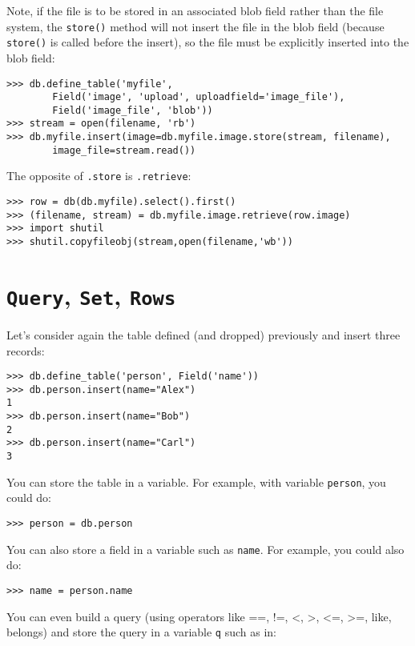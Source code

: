 \documentclass[justified,sixbynine,notoc]{tufte-book}
\def\ft{\small\tt}
\def\inxx#1{\index{#1}}
\begin{document}
\begin{fullwidth}
Note, if the file is to be stored in an associated blob field rather than the file system, the {\ft store()} method will not insert the file in the blob field (because {\ft store()} is called before the insert), so the file must be explicitly inserted into the blob field:
\begin{lstlisting}
>>> db.define_table('myfile',
        Field('image', 'upload', uploadfield='image_file'),
        Field('image_file', 'blob'))
>>> stream = open(filename, 'rb')
>>> db.myfile.insert(image=db.myfile.image.store(stream, filename),
        image_file=stream.read())
\end{lstlisting}

The opposite of {\ft .store} is {\ft .retrieve}:

\begin{lstlisting}
>>> row = db(db.myfile).select().first()
>>> (filename, stream) = db.myfile.image.retrieve(row.image)
>>> import shutil
>>> shutil.copyfileobj(stream,open(filename,'wb'))
\end{lstlisting}

\goodbreak\section{{\ft Query}, {\ft Set}, {\ft Rows}}

Let's consider again the table defined (and dropped) previously and insert three records:
\begin{lstlisting}
>>> db.define_table('person', Field('name'))
>>> db.person.insert(name="Alex")
1
>>> db.person.insert(name="Bob")
2
>>> db.person.insert(name="Carl")
3
\end{lstlisting}

You can store the table in a variable. For example, with variable {\ft person}, you could do:

\inxx{Table}
\begin{lstlisting}
>>> person = db.person
\end{lstlisting}

You can also store a field in a variable such as {\ft name}.  For example, you could also do:

\inxx{Field}
\begin{lstlisting}
>>> name = person.name
\end{lstlisting}

You can even build a query (using operators like ==, !=, <, >, <=, >=, like, belongs) and store the query in a variable {\ft q} such as in:


\end{fullwidth}
\end{document}
